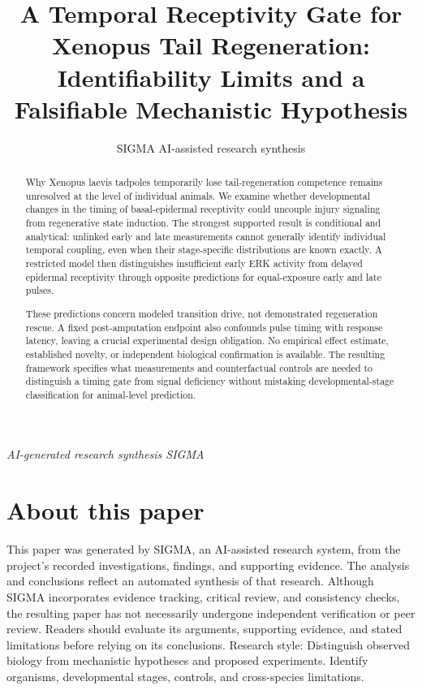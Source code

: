 \documentclass[11pt]{article}
\title{A Temporal Receptivity Gate for Xenopus Tail Regeneration: Identifiability Limits and a Falsifiable Mechanistic Hypothesis}
\date{}
\author{SIGMA AI-assisted research synthesis}
\begin{document}
\maketitle
\begin{center}\end{center}
\begin{center}\small\textit{AI-generated research synthesis \textperiodcentered{} SIGMA}\end{center}

\begin{abstract}
Why Xenopus laevis tadpoles temporarily lose tail-regeneration competence remains unresolved at the level of individual animals. We examine whether developmental changes in the timing of basal-epidermal receptivity could uncouple injury signaling from regenerative state induction. The strongest supported result is conditional and analytical: unlinked early and late measurements cannot generally identify individual temporal coupling, even when their stage-specific distributions are known exactly. A restricted model then distinguishes insufficient early ERK activity from delayed epidermal receptivity through opposite predictions for equal-exposure early and late pulses.

These predictions concern modeled transition drive, not demonstrated regeneration rescue. A fixed post-amputation endpoint also confounds pulse timing with response latency, leaving a crucial experimental design obligation. No empirical effect estimate, established novelty, or independent biological confirmation is available. The resulting framework specifies what measurements and counterfactual controls are needed to distinguish a timing gate from signal deficiency without mistaking developmental-stage classification for animal-level prediction.
\end{abstract}
\section*{About this paper}
This paper was generated by SIGMA, an AI-assisted research system, from the project's recorded investigations, findings, and supporting evidence.
The analysis and conclusions reflect an automated synthesis of that research. Although SIGMA incorporates evidence tracking, critical review, and consistency checks, the resulting paper has not necessarily undergone independent verification or peer review.
Readers should evaluate its arguments, supporting evidence, and stated limitations before relying on its conclusions.
Research style: Distinguish observed biology from mechanistic hypotheses and proposed experiments. Identify organisms, developmental stages, controls, and cross-species limitations.
\end{document}
